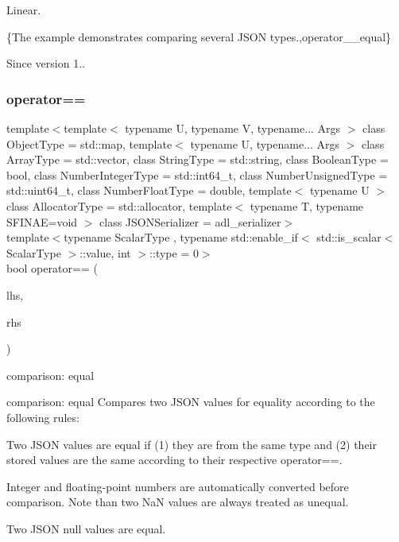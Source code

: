 Linear.

\{The example demonstrates comparing several J\+S\+ON types.,operator\+\_\+\+\_\+equal\}

\begin{DoxySince}{Since}
version 1.. 
\end{DoxySince}
\mbox{\label{classnlohmann_1_1basic__json_aba21440ea1aff44f718285ed7d6d20d9}} 
\subsubsection{\texorpdfstring{operator==}{operator==}\hspace{0.1cm}{\footnotesize\ttfamily [2/3]}}
{\footnotesize\ttfamily template$<$template$<$ typename U, typename V, typename... Args $>$ class Object\+Type = std\+::map, template$<$ typename U, typename... Args $>$ class Array\+Type = std\+::vector, class String\+Type  = std\+::string, class Boolean\+Type  = bool, class Number\+Integer\+Type  = std\+::int64\+\_\+t, class Number\+Unsigned\+Type  = std\+::uint64\+\_\+t, class Number\+Float\+Type  = double, template$<$ typename U $>$ class Allocator\+Type = std\+::allocator, template$<$ typename T, typename S\+F\+I\+N\+A\+E=void $>$ class J\+S\+O\+N\+Serializer = adl\+\_\+serializer$>$ \\
template$<$typename Scalar\+Type , typename std\+::enable\+\_\+if$<$ std\+::is\+\_\+scalar$<$ Scalar\+Type $>$\+::value, int $>$\+::type  = 0$>$ \\
bool operator== (\begin{DoxyParamCaption}\item[{\mbox{\hyperlink{classnlohmann_1_1basic__json_a4057c5425f4faacfe39a8046871786ca}{const\+\_\+reference}}}]{lhs,  }\item[{const Scalar\+Type}]{rhs }\end{DoxyParamCaption})\hspace{0.3cm}{\ttfamily [friend]}}



comparison\+: equal 

comparison\+: equal Compares two J\+S\+ON values for equality according to the following rules\+:
\begin{DoxyItemize}
\item Two J\+S\+ON values are equal if (1) they are from the same type and (2) their stored values are the same according to their respective {\ttfamily operator==}.
\item Integer and floating-\/point numbers are automatically converted before comparison. Note than two NaN values are always treated as unequal.
\item Two J\+S\+ON null values are equal.
\end{DoxyItemize}

